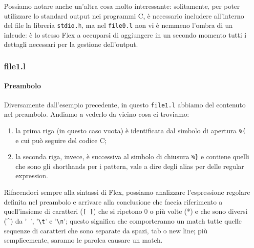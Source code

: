 \documentclass[class=book, crop=false, oneside, 12pt]{standalone}
\begin{document}
Possiamo notare anche un'altra cosa molto interessante: solitamente, per poter utilizzare lo standard output nei programmi C, è necessario includere all'interno del file la libreria \texttt{stdio.h}, ma nel \texttt{file0.l} non vi è nemmeno l'ombra di un inlcude: è lo stesso Flex a occuparsi di aggiungere in un secondo momento tutti i dettagli necessari per la gestione dell'output.

\subsubsection{file1.l}


\paragraph{Preambolo}
Diversamente dall'esempio precedente, in questo \texttt{file1.l} abbiamo del contenuto nel preambolo. Andiamo a vederlo da vicino cosa ci troviamo:

\begin{enumerate}
    \item la prima riga (in questo caso vuota) è identificata dal simbolo di apertura \texttt{\%\{} e cui può seguire del codice C;
    \item la seconda riga, invece, è successiva al simbolo di chiusura \texttt{\%\}} e contiene quelli che sono gli shorthands per i pattern, vale a dire degli alias per delle regular expression.
\end{enumerate}

Rifacendoci sempre alla sintassi di Flex, possiamo analizzare l'espressione regolare definita nel preambolo e arrivare alla conclusione che faccia riferimento a quell'insieme di caratteri (\texttt{[ ]}) che si ripetono \(0\) o più volte (*) e che sono diversi (\^{}) da '\texttt{ }', '\texttt{\textbackslash t}' e '\texttt{\textbackslash n}'; questo significa che comporteranno un match tutte quelle sequenze di caratteri che sono separate da spazi, tab o new line; più semplicemente, saranno le parolea causare un match.
\end{document}
